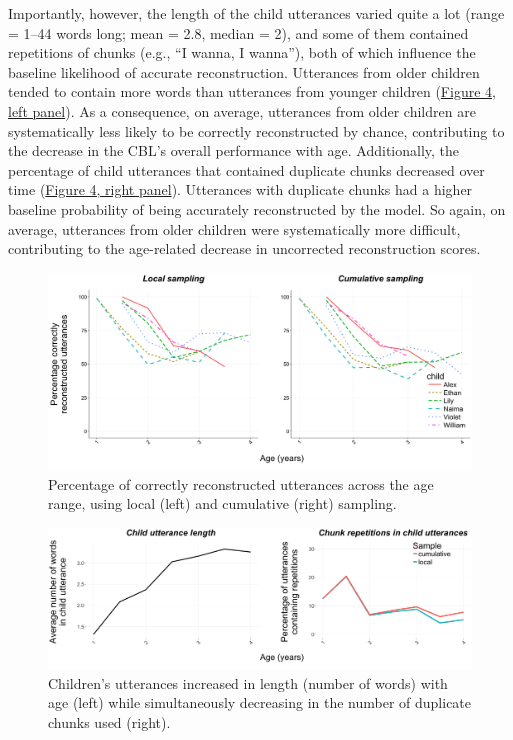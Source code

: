 \documentclass[man,mask,floatsintext]{apa6}
\begin{document}
Importantly, however, the length of the child utterances varied quite a
lot (range = 1--44 words long; mean = 2.8, median = 2), and some of them
contained repetitions of chunks (e.g., \enquote{I wanna, I wanna}), both
of which influence the baseline likelihood of accurate reconstruction.
Utterances from older children tended to contain more words than
utterances from younger children (\protect\hyperlink{fig4}{Figure 4,
left panel}). As a consequence, on average, utterances from older
children are systematically less likely to be correctly reconstructed by
chance, contributing to the decrease in the CBL's overall performance
with age. Additionally, the percentage of child utterances that
contained duplicate chunks decreased over time
(\protect\hyperlink{fig4}{Figure 4, right panel}). Utterances with
duplicate chunks had a higher baseline probability of being accurately
reconstructed by the model. So again, on average, utterances from older
children were systematically more difficult, contributing to the
age-related decrease in uncorrected reconstruction scores.

\begin{figure}

{\centering \includegraphics[width=0.95\linewidth]{images/plotbothreconstruction_perc} 

}

\caption{Percentage of correctly reconstructed utterances across the age range, using local (left) and cumulative (right) sampling.}\label{fig:fig3}
\end{figure}

\begin{figure}

{\centering \includegraphics[width=0.95\linewidth]{images/plotbothfactors} 

}

\caption{Children's utterances increased in length (number of words) with age (left) while simultaneously decreasing in the number of duplicate chunks used (right).}\label{fig:fig4}
\end{figure}
\end{document}
